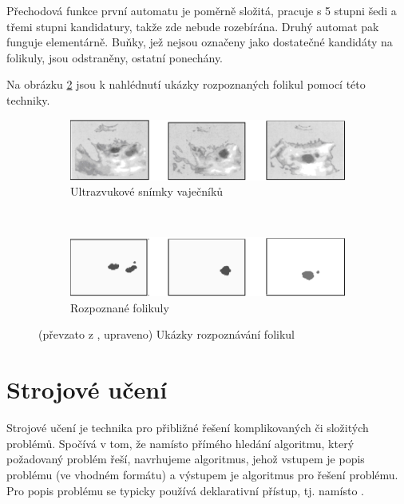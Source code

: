 \documentclass[a4paper,10pt]{article}
\begin{document}
Přechodová funkce první automatu je poměrně složitá, pracuje s 5 stupni šedi a třemi stupni kandidatury, takže zde nebude rozebírána. Druhý automat pak funguje elementárně. Buňky, jež nejsou označeny jako dostatečné kandidáty na folikuly, jsou odstraněny, ostatní ponechány.

Na obrázku \ref{img:Follicles} jsou k nahlédnutí ukázky rozpoznaných folikul pomocí této techniky.

\begin{figure}
  \begin{subfigure}[t]{\textwidth} \centering
    \includegraphics[width=\textwidth]{follicles-1}
    \caption{Ultrazvukové snímky vaječníků} \label{img:Follicles:Screens}
  \end{subfigure}
  \\
  \begin{subfigure}[t]{\textwidth} \centering
    \includegraphics[width=\textwidth]{follicles-2}
    \caption{Rozpoznané folikuly}
  \end{subfigure}
 
  \caption{(převzato z \cite{WanJiaZhoDu-ImProcBasFuzCelAuMod}, upraveno) Ukázky rozpoznávání folikul} \label{img:Follicles}
\end{figure}



\section{Strojové učení}

Strojové učení je technika pro přibližné řešení komplikovaných či složitých problémů. Spočívá v tom, že namísto přímého hledání algoritmu, který požadovaný problém řeší, navrhujeme algoritmus, jehož vstupem je popis problému (ve vhodném formátu) a výstupem je algoritmus pro řešení problému. Pro popis problému se typicky používá deklarativní přístup, tj.  namísto .
\end{document}
